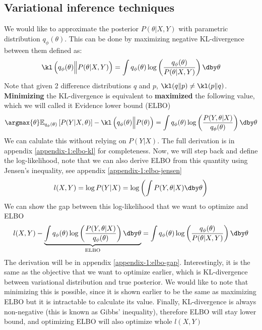 \subsection{Variational inference techniques}
\label{sec:vi-technique}
We would like to approximate the posterior $P(\theta | X, Y)$ with parametric distribution $q_{\phi} (\theta)$. This can be done by maximizing negative KL-divergence between them defined as:
\begin{equation}
    \kl\left( q_{\phi} (\theta) \Big\| P(\theta | X, Y) \right) = \int q_{\phi} (\theta) \log\left( \frac{q_{\phi} (\theta)}{P(\theta | X, Y)} \right) \dby \theta
\end{equation}
Note that given 2 difference distributions $q$ and $p$, $\kl(q \| p) \ne \kl(p \| q)$. \textbf{Minimizing} the KL-divergence is equivalent to \textbf{maximized} the following value, which we will called it Evidence lower bound (ELBO)
\begin{equation}
    \argmax{\theta} \mathbb{E}_{q_{\phi} (\theta)} \left[ P(Y | X, \theta) \right] - \kl \left(q_{\phi} (\theta) \Big\| P(\theta) \right) = \int q_{\phi}(\theta)\log\left(\frac{P(Y, \theta | X)}{q_{\phi}(\theta)}\right) \dby \theta
\end{equation}
We can calulate this without relying on $P(Y | X)$. The full derivation is in appendix \ref{appendix-1:elbo-kl} for completeness. Now, we will step back and define the log-likelihood, note that we can also derive ELBO from this quantity using Jensen's inequality, see appendix \ref{appendix-1:elbo-jensen}
\begin{equation}
    l(X, Y) = \log P(Y| X) = \log \left( \int P(Y,  \theta | X) \dby \theta \right)
\end{equation}
We can show the gap between this log-likelihood that we want to optimize and ELBO 
\begin{equation}
    l(X, Y) - \underbrace{\int q_{\phi}(\theta) \log\left(\frac{P(Y, \theta | X)}{q_{\phi}(\theta)}\right) \dby \theta}_{\text{ELBO}} = \int q_{\phi} (\theta) \log\left( \frac{q_{\phi} (\theta)}{P(\theta | X, Y)} \right) \dby \theta
\end{equation}
The derivation will be in appendix \ref{appendix-1:elbo-gap}. Interestingly, it is the same as the objective that we want to optimize earlier, which is KL-divergence between variational distribution and true posterior. We would like to note that minimizing this is possible, since it is shown earlier to be the same as maximizing ELBO but it is intractable to calculate its value. Finally, KL-divergence is always non-negative (this is known as Gibbs' inequality), therefore ELBO will stay lower bound, and optimizing ELBO will also optimize whole $l(X, Y)$

